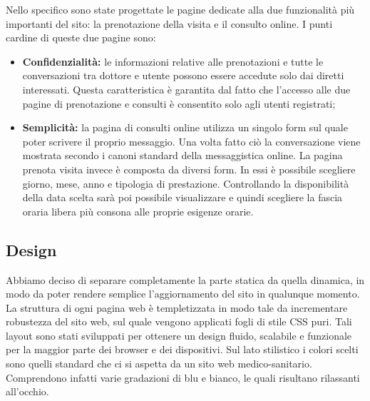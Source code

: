 Nello specifico sono state progettate le pagine dedicate alla due funzionalità più importanti del sito: la prenotazione della visita e il consulto online.
I punti cardine di queste due pagine sono:
\begin{itemize}
\item \textbf{Confidenzialità:} le informazioni relative alle prenotazioni e tutte le conversazioni tra dottore e utente possono essere accedute solo dai diretti interessati. Questa caratteristica è garantita dal fatto che l’accesso alle due pagine di prenotazione e consulti è consentito solo agli utenti registrati;


\item \textbf{Semplicità:} la pagina di consulti online utilizza un singolo form sul quale poter scrivere il proprio messaggio. Una volta fatto ciò la conversazione viene mostrata secondo i canoni standard della messaggistica online. La pagina prenota visita invece è composta da diversi form. In essi è possibile scegliere giorno, mese, anno e tipologia di prestazione. Controllando la disponibilità della data scelta sarà poi possibile visualizzare e quindi scegliere la fascia oraria libera più consona alle proprie esigenze orarie.


\end{itemize}


\subsection{Design}
Abbiamo deciso di separare completamente la parte statica da quella dinamica, in modo da poter rendere semplice l’aggiornamento del sito in qualunque momento.
La struttura di ogni pagina web è templetizzata in modo
tale da incrementare robustezza del sito web, sul quale vengono applicati fogli di stile CSS puri.
Tali layout sono stati sviluppati per ottenere un design fluido, scalabile e funzionale per la maggior parte dei browser e dei dispositivi.
Sul lato stilistico i colori scelti sono quelli standard che ci si aspetta da un sito web medico-sanitario. Comprendono infatti varie gradazioni di blu e bianco, le quali risultano rilassanti all’occhio.

